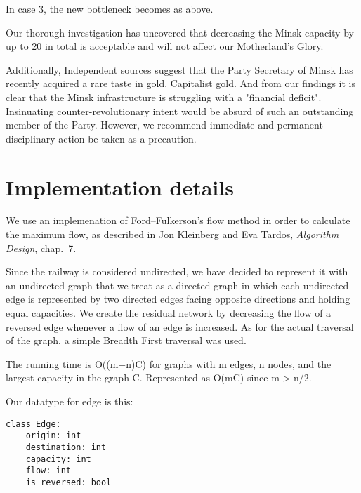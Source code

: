 \documentclass{tufte-handout}
\begin{document}
 In case 3, the new bottleneck becomes as above.

\bigskip
\bigskip
\bigskip
\bigskip

Our thorough investigation has uncovered that decreasing the Minsk capacity by up to 20 in total is acceptable and will not affect our Motherland's Glory. 

 Additionally, Independent sources suggest that the Party Secretary of Minsk has recently acquired a rare taste in gold. Capitalist gold. And from our findings it is clear that the Minsk infrastructure is struggling with a "financial deficit". Insinuating counter-revolutionary intent would be absurd of such an outstanding member of the Party. However, we recommend immediate and permanent disciplinary action be taken as a precaution.

  \section{Implementation details}

   We use an implemenation of Ford--Fulkerson's flow method in order to calculate the maximum flow, as described in Jon Kleinberg and Eva Tardos, \emph{Algorithm Design}, chap.~7.

  Since the railway is considered undirected, we have decided to represent it with an undirected graph that we treat as a directed graph in which each undirected edge is represented by two directed edges facing opposite directions and holding equal capacities.
We create the residual network by decreasing the flow of a reversed edge whenever a flow of an edge is increased.
As for the actual traversal of the graph, a simple Breadth First traversal was used.

\bigskip

  The running time is O((m+n)C) for graphs with m edges, n nodes, and the largest capacity in the graph C. Represented as O(mC) since m > n/2.

\bigskip

  Our datatype for edge is this:

  \begin{verbatim}
class Edge:
    origin: int
    destination: int
    capacity: int
    flow: int
    is_reversed: bool
  \end{verbatim}
\end{document}
